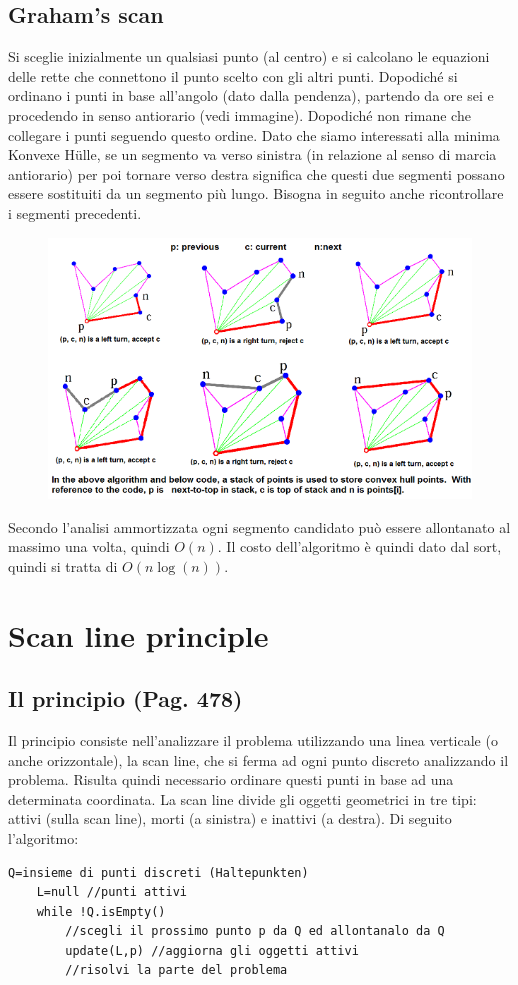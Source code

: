 \documentclass[a4paper]{book}
\newcommand{\lstIndent}{4}
\begin{document}
\subsection{Graham's scan}
Si sceglie inizialmente un qualsiasi punto (al centro) e si calcolano le equazioni delle rette che connettono il punto scelto con gli altri punti. Dopodiché si ordinano i punti in base all'angolo (dato dalla pendenza), partendo da ore sei e procedendo in senso antiorario (vedi immagine). Dopodiché non rimane che collegare i punti seguendo questo ordine. Dato che siamo interessati alla minima Konvexe Hülle, se un segmento va verso sinistra (in relazione al senso di marcia antiorario) per poi tornare verso destra significa che questi due segmenti possano essere sostituiti da un segmento più lungo. Bisogna in seguito anche ricontrollare i segmenti precedenti. 
\begin{figure}[H]
\centering
\includegraphics[scale=0.6]{Figures/graham.png}
\end{figure}
Secondo l'analisi ammortizzata ogni segmento candidato può essere allontanato al massimo una volta, quindi $O(n)$. Il costo dell'algoritmo è quindi dato dal sort, quindi si tratta di $O(n\log (n))$.

\section{Scan line principle}
\subsection{Il principio (Pag. 478)}
Il principio consiste nell'analizzare il problema utilizzando una linea verticale (o anche orizzontale), la scan line, che si ferma ad ogni punto discreto analizzando il problema. Risulta quindi necessario ordinare questi punti in base ad una determinata coordinata. La scan line divide gli oggetti geometrici in tre tipi: attivi (sulla scan line), morti (a sinistra) e inattivi (a destra). Di seguito l'algoritmo:
\begin{lstlisting}[tabsize=\lstIndent]
	Q=insieme di punti discreti (Haltepunkten)
	L=null //punti attivi
	while !Q.isEmpty()
		//scegli il prossimo punto p da Q ed allontanalo da Q
		update(L,p) //aggiorna gli oggetti attivi
		//risolvi la parte del problema
\end{lstlisting}
\end{document}
